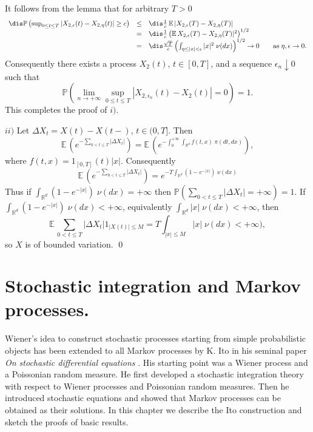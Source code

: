 \documentclass[preprint]{imsart}
\def\P{\mathbb P}
\def\E{\mathbb E}
\def\R{\mathbb R}
\begin{document}
{\noindent It follows from the lemma that for arbitrary $T>0$
$$
\begin{array}{lll}\dis
\P\left(\sup_{0\le t\le T}|
X_{2,\epsilon}(t)- X_{2,\eta}(t) |\ge c\right)
&\le&\dis
 \frac{1}{c} \,\E\,|
X_{2,\epsilon}(T)- X_{2,\eta}(T) |
\\
&=&\dis
 \frac{1}{c} \left(\E\,
X_{2,\epsilon}(T)- X_{2,\eta}(T) |^2\right)^{1/2}
\\
&=&\dis
 \frac{\sqrt{T}}{c} \left(
\int_{\eta\le |x|<\epsilon}|x|^2\; \nu(dx)
 \right)^{1/2}\to 0
 \qquad {\rm as\;} \eta,\epsilon\to 0.
 \end{array}
$$
Consequently there exists a process $X_2(t)$, $t\in [0,T]$,
and a sequence $\epsilon_n\downarrow 0$ such that
$$
\P\left(\lim_{n\to +\infty}\sup_{0\le t\le T}|
X_{2,\epsilon_n}(t)- X_{2}(t) |=0\right)=1.
$$
This completes the proof of $i)$.

$ii)$ Let $\Delta X_t=X(t)-X(t-)$, $t\in (0,T]$. Then
$$
\E\, \left(e^{-\sum_{0<t\le T}|\Delta X_t|}\right)
=\E\, \left( e^{-\int_0^{+\infty}\int_{\R^d}f(t,x)\;
\pi(dt,dx)}\right),
$$
where $f(t,x) = 1_{[0,T]}(t)|x|$. Consequently
$$
\E\, \left(e^{-\sum_{0<t\le T}|\Delta X_t|}\right)
= e^{-T\int_{\R^d}(1-e^{-|x|})\;\nu(dx)}
$$
Thus if $\int_{\R^d}(1-e^{-|x|})\;\nu(dx)=+\infty$ then
$\P (\sum_{0<t\le T}|\Delta X_t|=+\infty)=1$. If
$\int_{\R^d}(1-e^{-|x|})\;\nu(dx)<+\infty$, equivalently
$\int_{\R^d}|x|\;\nu(dx)<+\infty$, then
$$
\E \,\sum_{0<t\le T}|\Delta X_t|1_{|X(t)|\le M}=
T \int_{|x|\le M} |x|\; \nu(dx)<+\infty),
$$
so $X$ is of bounded variation.
\qed



\chapter{Stochastic integration and Markov processes.}


Wiener's idea to construct stochastic processes starting from
simple probabilistic objects has been extended to all Markov
processes by K. Ito in his seminal paper {\it On stochastic differential
equations} \cite{ito}.
His starting point was a Wiener process and a Poissonian random
measure. He first developed a  stochastic integration theory with
respect to Wiener processes and Poissonian random measures. Then
he introduced stochastic equations and showed that Markov
processes can be obtained as their solutions. In this chapter we
describe the Ito construction and sketch the proofs of basic results.



}
\end{document}
